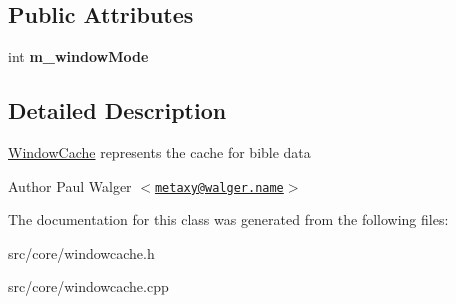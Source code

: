 \subsection*{Public Attributes}
\begin{DoxyCompactItemize}
\item 
\hypertarget{classWindowCache_ac3ce6ca1910826b7c1eecff15ab5ebcf}{
int {\bfseries m\_\-windowMode}}
\label{classWindowCache_ac3ce6ca1910826b7c1eecff15ab5ebcf}

\end{DoxyCompactItemize}


\subsection{Detailed Description}
\hyperlink{classWindowCache}{WindowCache} represents the cache for bible data

\begin{DoxyAuthor}{Author}
Paul Walger $<$\href{mailto:metaxy@walger.name}{\tt metaxy@walger.name}$>$ 
\end{DoxyAuthor}


The documentation for this class was generated from the following files:\begin{DoxyCompactItemize}
\item 
src/core/windowcache.h\item 
src/core/windowcache.cpp\end{DoxyCompactItemize}
